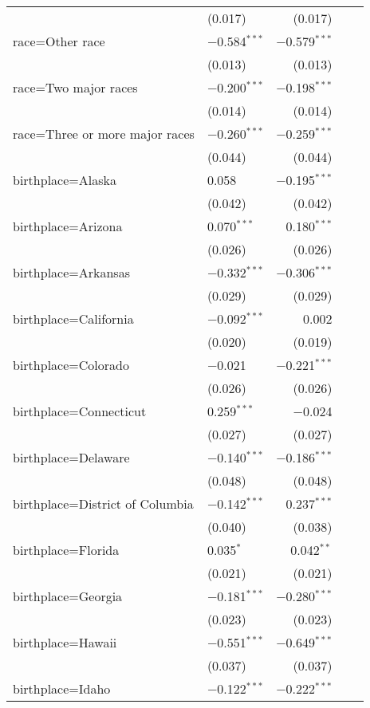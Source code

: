 \begin{longtable}{ll|rrr}
        & (0.017) & (0.017) \\ 
        race=Other race & $-$0.584$^{***}$ & $-$0.579$^{***}$ \\ 
        & (0.013) & (0.013) \\ 
        race=Two major races & $-$0.200$^{***}$ & $-$0.198$^{***}$ \\ 
        & (0.014) & (0.014) \\ 
        race=Three or more major races & $-$0.260$^{***}$ & $-$0.259$^{***}$ \\
        & (0.044) & (0.044) \\ 
        birthplace=Alaska & 0.058 & $-$0.195$^{***}$ \\ 
        & (0.042) & (0.042) \\ 
        birthplace=Arizona & 0.070$^{***}$ & 0.180$^{***}$ \\ 
        & (0.026) & (0.026) \\ 
        birthplace=Arkansas & $-$0.332$^{***}$ & $-$0.306$^{***}$ \\ 
        & (0.029) & (0.029) \\ 
        birthplace=California & $-$0.092$^{***}$ & 0.002 \\ 
        & (0.020) & (0.019) \\ 
        birthplace=Colorado & $-$0.021 & $-$0.221$^{***}$ \\ 
        & (0.026) & (0.026) \\ 
        birthplace=Connecticut & 0.259$^{***}$ & $-$0.024 \\ 
        & (0.027) & (0.027) \\ 
        birthplace=Delaware & $-$0.140$^{***}$ & $-$0.186$^{***}$ \\ 
        & (0.048) & (0.048) \\ 
        birthplace=District of Columbia & $-$0.142$^{***}$ & 0.237$^{***}$ \\ 
        & (0.040) & (0.038) \\ 
        birthplace=Florida & 0.035$^{*}$ & 0.042$^{**}$ \\ 
        & (0.021) & (0.021) \\ 
        birthplace=Georgia & $-$0.181$^{***}$ & $-$0.280$^{***}$ \\ 
        & (0.023) & (0.023) \\ 
        birthplace=Hawaii & $-$0.551$^{***}$ & $-$0.649$^{***}$ \\ 
        & (0.037) & (0.037) \\ 
        birthplace=Idaho & $-$0.122$^{***}$ & $-$0.222$^{***}$ \\ 

\end{longtable}
